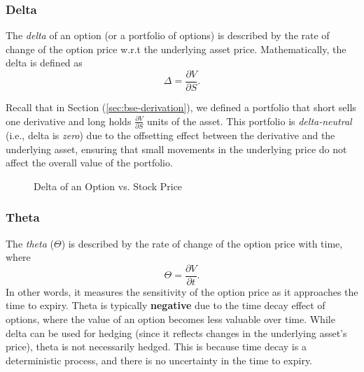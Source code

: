 \subsubsection{Delta}
The \textit{delta} of an option (or a portfolio of options) is described by the rate of change of the option price w.r.t the underlying asset price. Mathematically, the delta is defined as
\begin{equation}
    \Delta = \frac{\partial V}{\partial S}.
\end{equation}

Recall that in Section (\ref{sec:bse-derivation}), we defined a portfolio that short sells one derivative and long holds $\frac{\partial V}{\partial S}$ units of the asset. 
This portfolio is \textit{delta-neutral} (i.e., delta is \textit{zero}) due to the offsetting effect between the derivative and the underlying asset, ensuring that small movements in the underlying price do not affect the overall value of the portfolio.
\begin{figure}[H]
    \centering
    \caption{Delta of an Option vs. Stock Price}
    \label{fig:delta-plot}
\end{figure}

\subsubsection{Theta}
The \textit{theta} ($\Theta$) is described by the rate of change of the option price with time, where
\begin{equation}
    \Theta = \frac{\partial V}{\partial t}.
\end{equation}
In other words, it measures the sensitivity of the option price as it approaches the time to expiry. Theta is typically \textbf{negative} due to the time decay effect of options, where the value of an option becomes less valuable over time. 
While delta can be used for hedging (since it reflects changes in the underlying asset's price), theta is not necessarily hedged. This is because time decay is a deterministic process, and there is no
uncertainty in the time to expiry. 

